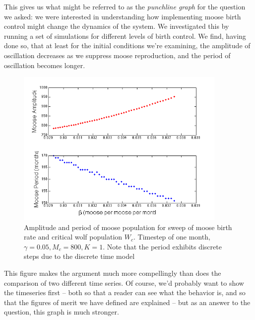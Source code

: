 \documentclass{tufte-handout}
\begin{document}
This gives us what might be referred to as the {\em punchline graph} for the question we asked:  we were interested in understanding how implementing moose birth control might change the dynamics of the system.  We investigated this by running a set of simulations for different levels of birth control.  We find, having done so, that at least for the initial conditions we're examining, the amplitude of oscillation decreases as we suppress moose reproduction, and the period of oscillation becomes longer.  \begin{figure}[h!]
\includegraphics[width=4in]{figs/MooseBCSweepClean}
\caption{Amplitude and period of moose population for sweep of moose birth rate and critical wolf population $W_c$.  Timestep of one month,  $\gamma = 0.05, M_c = 800, K=1$.  Note that the period exhibits discrete steps due to the discrete time model}
\end{figure}

This figure makes the argument much more compellingly than does the comparison of two different time series.  Of course, we'd probably want to show the timeseries first -- both so that a reader can see what the behavior is, and so that the figures of merit we have defined are explained -- but as an answer to the question, this graph is much stronger.
\end{document}

